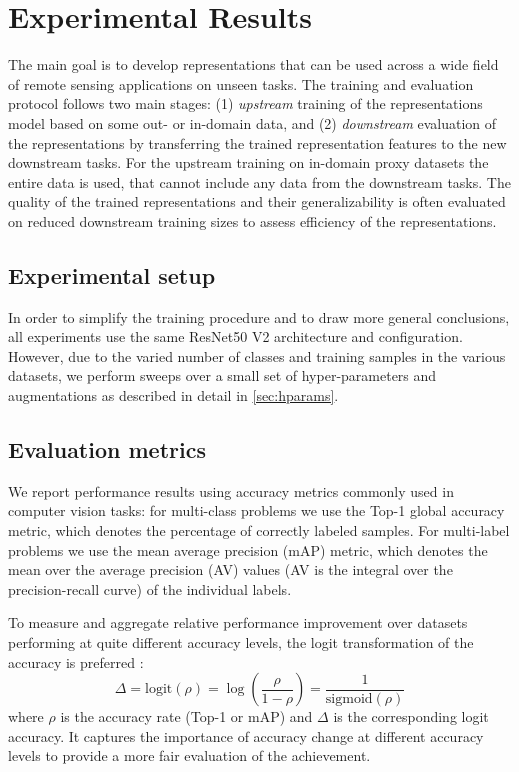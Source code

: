 \section{Experimental Results}




The main goal is to develop representations that can be used across a wide field of remote sensing applications on unseen tasks. The training and evaluation protocol follows two main stages: (1) \emph{upstream} training of the representations model based on some out- or in-domain data, and (2) \emph{downstream} evaluation of the representations by transferring the trained representation features to the new downstream tasks. For the upstream training on in-domain proxy datasets the entire data is used, that cannot include any data from the downstream tasks. The quality of the trained representations and their generalizability is often evaluated on reduced downstream training sizes to assess efficiency of the representations.

\subsection{Experimental setup}
In order to simplify the training procedure and to draw more general conclusions, all experiments use the same ResNet50 V2 architecture \citep{he2016:identity} and configuration. However, due to the varied number of classes and training samples in the various datasets, we perform sweeps over a small set of hyper-parameters and augmentations
as described in detail in \cref{sec:hparams}.




\subsection{Evaluation metrics}
We report performance results using accuracy metrics commonly used in computer vision tasks: for multi-class problems we use the Top-1 global accuracy metric, which denotes the percentage of correctly labeled samples.
For multi-label problems we use the mean average precision (mAP) metric, which denotes the mean over the average precision (AV) values (AV is the integral over the precision-recall curve) of the individual labels. 

To measure and aggregate relative performance improvement over datasets performing at quite different accuracy levels, the logit transformation of the accuracy is preferred \citep{kornblith2019:imagenet}:
\[ \Delta = \text{logit}(\rho) = \log\left(\frac{\rho}{1-\rho}\right) = \frac{1}{\text{sigmoid}(\rho)} \]
where $\rho$ is the accuracy rate (Top-1 or mAP) and $\Delta$ is the corresponding logit accuracy. It captures the importance of accuracy change at different accuracy levels to provide a more fair evaluation of the achievement.







